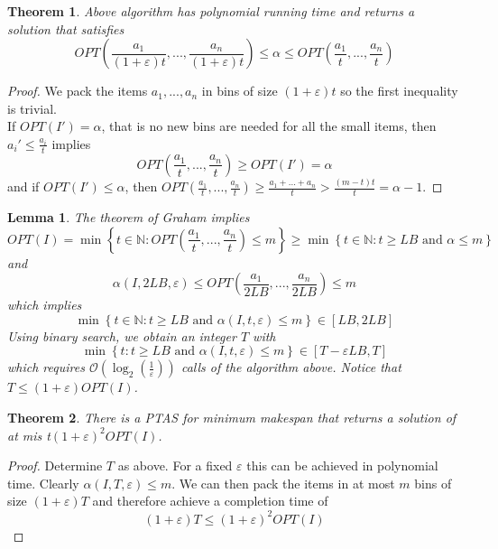 \documentclass[a4paper, 12pt]{article}
\newtheorem{theorem}{Theorem}[section]
\newtheorem{lemma}{Lemma}[section]
\begin{document}
	\begin{theorem}
		Above algorithm has polynomial running time and returns a solution that satisfies \[OPT\left(\frac{a_1}{(1+\varepsilon)t},...,\frac{a_n}{(1+\varepsilon)t}\right) \leq \alpha \leq OPT\left(\frac{a_1}{t},...,\frac{a_n}{t}\right)\]
	\end{theorem}
	\begin{proof}
		We pack the items $a_1,...,a_n$ in bins of size $(1+\varepsilon)t$ so the first inequality is trivial.\\
		If $OPT(I') = \alpha$, that is no new bins are needed for all the small items, then $a_i' \leq \frac{a_i}{t}$ implies \[OPT\left(\frac{a_1}{t},...,\frac{a_n}{t}\right) \geq OPT(I') = \alpha\] and if $OPT(I') \leq \alpha$, then $OPT\left(\frac{a_1}{t},...,\frac{a_n}{t}\right) \geq \frac{a_1+...+a_n}{t} > \frac{(m-t)t}{t} = \alpha-1$.
	\end{proof}
	\begin{lemma}
		The theorem of Graham implies \[OPT(I)  = \min\left\{t \in \mathbb{N}: OPT\left(\frac{a_1}{t},...,\frac{a_n}{t}\right) \leq m\right\} \geq \min\left\{t \in \mathbb{N}: t \geq LB \text{ and } \alpha \leq m\right\}\] and \[\alpha(I,2LB,\varepsilon) \leq OPT\left(\frac{a_1}{2LB},...,\frac{a_n}{2LB}\right) \leq m\] which implies \[\min\left\{t \in \mathbb{N}: t \geq LB \text{ and } \alpha(I,t,\varepsilon) \leq m\right\} \in [LB, 2LB]\]
		Using binary search, we obtain an integer $T$ with \[\min\left\{t: t \geq LB \text{ and } \alpha(I,t,\varepsilon) \leq m\right\} \in [T-\varepsilon LB, T]\] which requires $\mathcal{O}\left(\log_2\left(\frac{1}{\varepsilon}\right)\right)$ calls of the algorithm above. Notice that $T \leq (1+\varepsilon)OPT(I)$.
	\end{lemma}
	\begin{theorem}
		There is a PTAS for minimum makespan that returns a solution of at mis t$(1+\varepsilon)^2OPT(I)$.
	\end{theorem}
	\begin{proof}
		Determine $T$ as above. For a fixed $\varepsilon$ this can be achieved in polynomial time. Clearly $\alpha(I,T,\varepsilon) \leq m$. We can then pack the items in at most $m$ bins of size $(1+\varepsilon)T$ and therefore achieve a completion time of \[(1+\varepsilon)T \leq (1+\varepsilon)^2OPT(I)\] 
	\end{proof}
\end{document}
